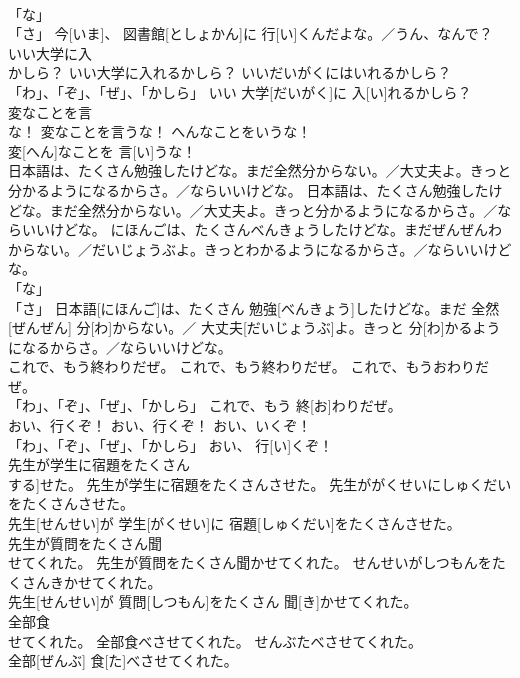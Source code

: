 \documentclass[8pt]{extreport}
\begin{document}
\begin{CJK}{UTF8}{min}
\\	「な」 
\\	「さ」	今[いま]、 図書館[としょかん]に 行[い]くんだよな。／うん、なんで？		
\\	いい大学に入
\\	かしら？	いい大学に入れるかしら？	いいだいがくにはいれるかしら？	
\\	「わ」、「ぞ」、「ぜ」、「かしら」	いい 大学[だいがく]に 入[い]れるかしら？		
\\	変なことを言
\\	な！	変なことを言うな！	へんなことをいうな！	
\\	変[へん]なことを 言[い]うな！		
\\	日本語は、たくさん勉強したけどな。まだ全然分からない。／大丈夫よ。きっと分かるようになるからさ。／ならいいけどな。	日本語は、たくさん勉強したけどな。まだ全然分からない。／大丈夫よ。きっと分かるようになるからさ。／ならいいけどな。	にほんごは、たくさんべんきょうしたけどな。まだぜんぜんわからない。／だいじょうぶよ。きっとわかるようになるからさ。／ならいいけどな。	
\\	「な」 
\\	「さ」	日本語[にほんご]は、たくさん 勉強[べんきょう]したけどな。まだ 全然[ぜんぜん] 分[わ]からない。／ 大丈夫[だいじょうぶ]よ。きっと 分[わ]かるようになるからさ。／ならいいけどな。		
\\	これで、もう終わりだぜ。	これで、もう終わりだぜ。	これで、もうおわりだぜ。	
\\	「わ」、「ぞ」、「ぜ」、「かしら」	これで、もう 終[お]わりだぜ。		
\\	おい、行くぞ！	おい、行くぞ！	おい、いくぞ！	
\\	「わ」、「ぞ」、「ぜ」、「かしら」	おい、 行[い]くぞ！		
\\	先生が学生に宿題をたくさん
\\	する]せた。	先生が学生に宿題をたくさんさせた。	先生ががくせいにしゅくだいをたくさんさせた。	
\\	先生[せんせい]が 学生[がくせい]に 宿題[しゅくだい]をたくさんさせた。		
\\	先生が質問をたくさん聞
\\	せてくれた。	先生が質問をたくさん聞かせてくれた。	せんせいがしつもんをたくさんきかせてくれた。	
\\	先生[せんせい]が 質問[しつもん]をたくさん 聞[き]かせてくれた。		
\\	全部食
\\	せてくれた。	全部食べさせてくれた。	せんぶたべさせてくれた。	
\\	全部[ぜんぶ] 食[た]べさせてくれた。		

\end{CJK}
\end{document}
